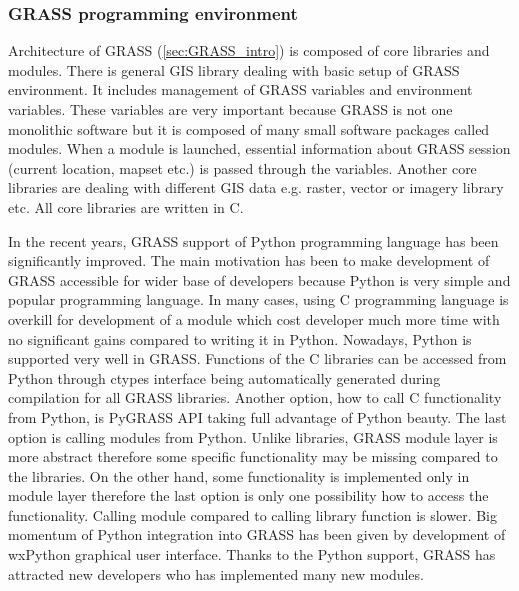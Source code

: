 \documentclass[a4paper,12pt]{article}
\begin{document}
\subsubsection{GRASS programming  environment}




Architecture of GRASS (\ref{sec:GRASS_intro}) is composed of core libraries and modules. There is general GIS library 
dealing with basic setup of GRASS environment. It includes management of
GRASS variables and environment variables. These variables are very important because GRASS is not one monolithic software 
but it is composed of many small software packages called modules. When a module is launched, essential information 
about GRASS session (current location, mapset etc.) is passed through the variables. 
Another core libraries are dealing with different GIS data e.g. raster, vector or imagery library etc. 
All core libraries are written in C. 

In the recent years, GRASS support of Python programming language has been significantly 
improved. The main motivation has been to make development of GRASS accessible for wider base
of developers because Python is very simple and popular programming language. 
In many cases, using 
C programming language is overkill for development of a module which cost developer much more time 
with no significant gains compared to writing it in Python. Nowadays, Python is supported very well in GRASS.
Functions of the C libraries can be accessed from Python through ctypes interface being automatically generated during compilation
for all GRASS libraries.  
Another option, how to call C functionality from Python, is 
PyGRASS API taking full advantage of Python beauty.
The last option is calling modules from Python. Unlike libraries, GRASS module layer is more abstract
therefore some specific functionality may be missing compared to the libraries. 
On the other hand, some functionality is implemented
only in module layer therefore the last option is only one possibility how to access the functionality.
Calling module compared to calling library function is slower.
Big momentum of Python integration into GRASS has been given by development of wxPython graphical
user interface. 
Thanks to the Python support, GRASS has attracted new developers who has implemented many new modules.
\end{document}
